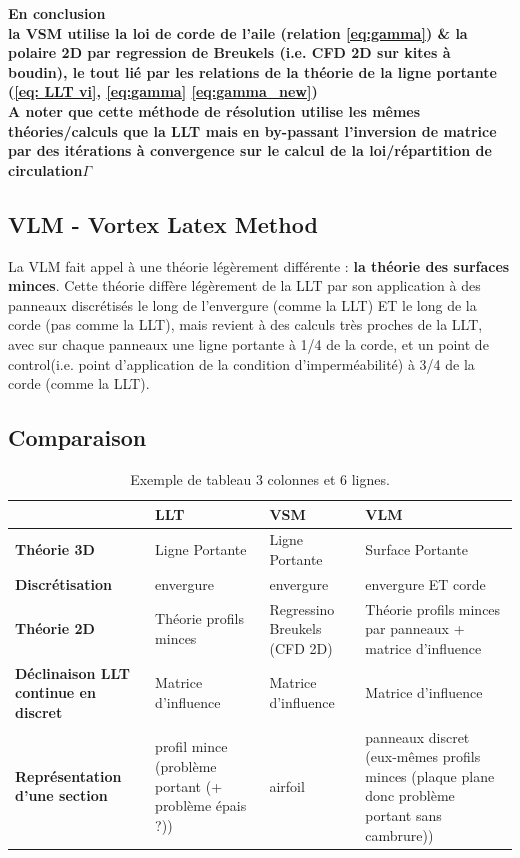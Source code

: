 \textbf{En conclusion}\\
\textbf{la VSM utilise la loi de corde de l'aile (relation \ref{eq:gamma}) \& la polaire 2D par regression de Breukels (i.e. CFD 2D sur kites à boudin), le tout lié par les relations de la théorie de la ligne portante (\ref{eq: LLT vi}, \ref{eq:gamma} \ref{eq:gamma_new})}\\

\textbf{A noter que cette méthode de résolution utilise les mêmes théories/calculs que la LLT mais en by-passant l'inversion de matrice par des itérations à convergence sur le calcul de la loi/répartition de circulation$\Gamma$}\\

\subsection{VLM - Vortex Latex Method} 
\label{subsec:Ch1.2.3}

La VLM fait appel à une théorie légèrement différente : \textbf{la théorie des surfaces minces}. Cette théorie diffère légèrement de la LLT par son application à des panneaux discrétisés le long de l'envergure (comme la LLT) ET le long de la corde (pas comme la LLT), mais revient à des calculs très proches de la LLT, avec sur chaque panneaux une ligne portante à 1/4 de la corde, et un point de control(i.e. point d'application de la condition d'imperméabilité) à 3/4 de la corde (comme la LLT).

\subsection{Comparaison} 
\label{subsec:Ch1.2.4}

\begin{table}[h!]
    \centering
    \begin{tabular}{|p{3cm}|p{3cm}|p{4cm}|p{4cm}|}
        \hline
        & \textbf{LLT} & \textbf{VSM} & \textbf{VLM} \\ \hline
        \textbf{Théorie 3D} & Ligne Portante & Ligne Portante & Surface Portante \\ \hline
        \textbf{Discrétisation} & envergure & envergure & envergure ET corde \\ \hline
        \textbf{Théorie 2D} & Théorie profils minces & Regressino Breukels (CFD 2D) & Théorie profils minces par panneaux + matrice d'influence \\ \hline
        \textbf{Déclinaison LLT continue en discret} & Matrice d'influence & Matrice d'influence & Matrice d'influence \\ \hline
        \textbf{Représentation d'une section} & profil mince (problème portant (+ problème épais ?)) & airfoil & panneaux discret (eux-mêmes profils minces (plaque plane donc problème portant sans cambrure)) \\ \hline
    \end{tabular}
    \caption{Exemple de tableau 3 colonnes et 6 lignes.}
    \label{tab:example}
\end{table}